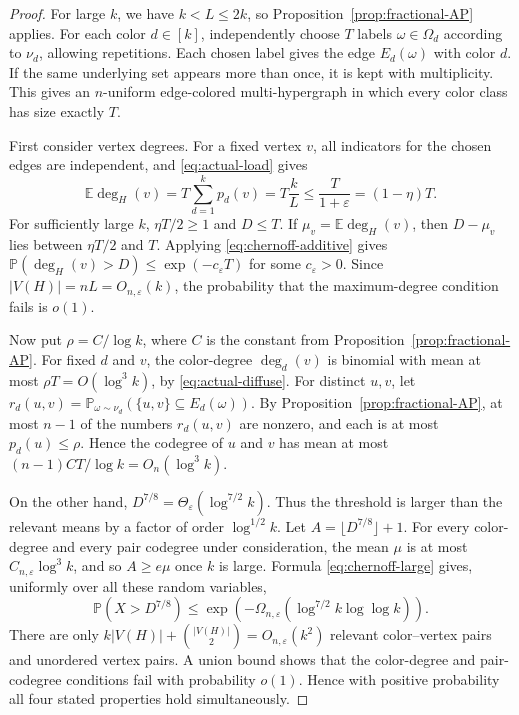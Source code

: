 \documentclass[twoside,12pt]{article}
\numberwithin{equation}{section}
\newcommand{\E}{\mathbb{E}}
\newcommand{\Prob}{\mathbb{P}}
\newcommand{\eps}{\varepsilon}
\begin{document}
\begin{proof}
For large $k$, we have $k<L\le2k$, so Proposition~\ref{prop:fractional-AP}
applies.  For each color $d\in[k]$, independently choose $T$ labels
$\omega\in\Omega_d$ according to $\nu_d$, allowing repetitions.  Each chosen
label gives the edge $E_d(\omega)$ with color $d$.  If the same underlying set
appears more than once, it is kept with multiplicity.  This gives an
$n$-uniform edge-colored multi-hypergraph in which every color class has size
exactly $T$.

First consider vertex degrees.  For a fixed vertex $v$, all indicators for the
chosen edges are independent, and \eqref{eq:actual-load} gives
\[
        \E\deg_H(v)=T\sum_{d=1}^k p_d(v)=T\frac{k}{L}
        \le \frac{T}{1+\eps}=(1-\eta)T.
\]
For sufficiently large $k$, $\eta T/2\ge1$ and $D\le T$.  If
$\mu_v=\E\deg_H(v)$, then $D-\mu_v$ lies between $\eta T/2$ and $T$.  Applying
\eqref{eq:chernoff-additive} gives $\Prob(\deg_H(v)>D)\le\exp(-c_\eps T)$ for
some $c_\eps>0$.  Since $|V(H)|=nL=O_{n,\eps}(k)$, the probability that the
maximum-degree condition fails is $o(1)$.

Now put $\rho=C/\log k$, where $C$ is the constant from
Proposition~\ref{prop:fractional-AP}.  For fixed $d$ and $v$, the color-degree
$\deg_d(v)$ is binomial with mean at most $\rho T=O(\log^3 k)$, by
\eqref{eq:actual-diffuse}.  For distinct $u,v$, let
$r_d(u,v)=\Prob_{\omega\sim\nu_d}(\{u,v\}\subseteq E_d(\omega))$.  By
Proposition~\ref{prop:fractional-AP}, at most $n-1$ of the numbers
$r_d(u,v)$ are nonzero, and each is at most $p_d(u)\le\rho$.  Hence the
codegree of $u$ and $v$ has mean at most $(n-1)CT/\log k=O_n(\log^3 k)$.

On the other hand, $D^{7/8}=\Theta_\eps(\log^{7/2}k)$.  Thus the threshold is
larger than the relevant means by a factor of order $\log^{1/2}k$.  Let
$A=\lfloor D^{7/8}\rfloor+1$.  For every color-degree and every pair codegree
under consideration, the mean $\mu$ is at most $C_{n,\eps}\log^3k$, and so
$A\ge e\mu$ once $k$ is large.  Formula \eqref{eq:chernoff-large} gives,
uniformly over all these random variables,
\[
        \Prob(X>D^{7/8})
        \le \exp\!\left(-\Omega_{n,\eps}(\log^{7/2}k\log\log k)\right).
\]
There are only $k|V(H)|+\binom{|V(H)|}{2}=O_{n,\eps}(k^2)$ relevant
color--vertex pairs and unordered vertex pairs.  A union bound shows that the
color-degree and pair-codegree conditions fail with probability $o(1)$.  Hence
with positive probability all four stated properties hold simultaneously.
\end{proof}
\end{document}
